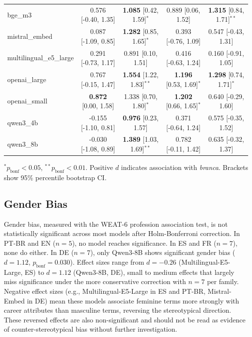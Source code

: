 \documentclass{sbc2019}
\begin{document}
\begin{table}[t]
{\begin{tabular}{lcccc}
bge\_m3 & 0.576 [-0.40, 1.35] & \textbf{1.085} [0.42, 1.59]$^{*}$ & 0.889 [0.06, 1.52] & \textbf{1.315} [0.84, 1.71]$^{**}$ \\
mistral\_embed & 0.087 [-1.09, 0.85] & \textbf{1.282} [0.85, 1.65]$^{*}$ & 0.393 [-0.76, 1.09] & 0.547 [-0.43, 1.31] \\
multilingual\_e5\_large & 0.291 [-0.73, 1.17] & 0.891 [0.10, 1.51] & 0.416 [-0.63, 1.24] & 0.160 [-0.91, 1.05] \\
openai\_large & 0.767 [-0.15, 1.47] & \textbf{1.554} [1.22, 1.83]$^{**}$ & \textbf{1.196} [0.53, 1.69]$^{*}$ & \textbf{1.298} [0.74, 1.71]$^{*}$ \\
openai\_small & \textbf{0.872} [0.00, 1.58] & 1.338 [0.70, 1.80]$^{*}$ & \textbf{1.202} [0.66, 1.65]$^{*}$ & 0.640 [-0.29, 1.60] \\
qwen3\_4b & -0.155 [-1.10, 0.81] & \textbf{0.976} [0.23, 1.57] & 0.371 [-0.64, 1.24] & 0.575 [-0.35, 1.52] \\
qwen3\_8b & -0.030 [-1.08, 0.89] & \textbf{1.389} [1.03, 1.69]$^{**}$ & 0.782 [-0.11, 1.42] & 0.635 [-0.32, 1.37] \\
\bottomrule
\end{tabular}%
}
\vspace{2mm}
\footnotesize{$^* p_{\mathrm{bonf}} < 0.05$, $^{**} p_{\mathrm{bonf}} < 0.01$. Positive $d$ indicates association with \textit{branca}. Brackets show 95\% percentile bootstrap CI.}
\end{table}

\subsection{Gender Bias}

Gender bias, measured with the WEAT-6 profession association test, is not statistically significant across most models after Holm-Bonferroni correction. In PT-BR and EN ($n = 5$), no model reaches significance. In ES and FR ($n = 7$), none do either. In DE ($n = 7$), only Qwen3-8B shows significant gender bias ($d = 1.12$, $p_{\mathrm{bonf}} = 0.030$). Effect sizes range from $d = -0.26$ (Multilingual-E5-Large, ES) to $d = 1.12$ (Qwen3-8B, DE), small to medium effects that largely miss significance under the more conservative correction with $n = 7$ per family. Negative effect sizes (e.g., Multilingual-E5-Large in ES and PT-BR, Mistral-Embed in DE) mean these models associate feminine terms more strongly with career attributes than masculine terms, reversing the stereotypical direction. These reversed effects are also non-significant and should not be read as evidence of counter-stereotypical bias without further investigation.
\end{document}

